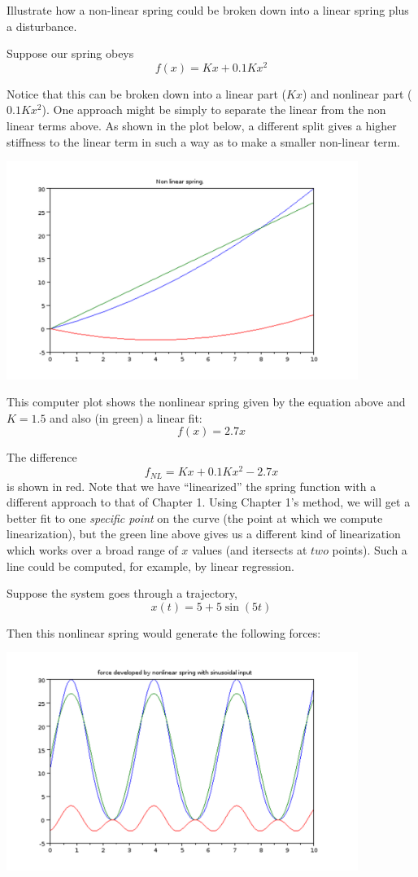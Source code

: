 \begin{Example}
Illustrate  how a non-linear spring could be broken down into a linear spring plus a disturbance.

Suppose our spring obeys
\[
f(x) = Kx + 0.1Kx^2
\]

Notice that this can be broken down into a linear part ($Kx$) and nonlinear part ($0.1Kx^2$).  One approach might be simply to separate the linear from the non linear terms above.  As shown in the plot below, a different split gives a higher stiffness to the linear term in such a way as to make a smaller non-linear term.

\includegraphics[width=4.5in]{figs06/nlspringa.png}



This computer plot shows the nonlinear spring given by the equation above and $K=1.5$ and also (in green) a linear fit:
\[
f(x) = 2.7x
\]

The difference
\[
f_{NL} = Kx + 0.1Kx^2 - 2.7x
\]
is shown in red. Note that we have ``linearized'' the spring function with a different approach to that of Chapter 1.   Using Chapter 1's method, we will get a better fit to one {\it specific point} on the curve (the point at which we compute linearization), but the green line above gives us a different kind of linearization which works over a broad range of $x$ values (and itersects at $two$ points).  Such a line could be computed, for example, by linear regression. 



Suppose the system goes through a trajectory,
\[
x(t) = 5+5\sin(5t)
\]

Then this nonlinear spring would generate the following forces:

\includegraphics[width=4.5in]{figs06/fsinnlspringa.png}


\end{Example}
